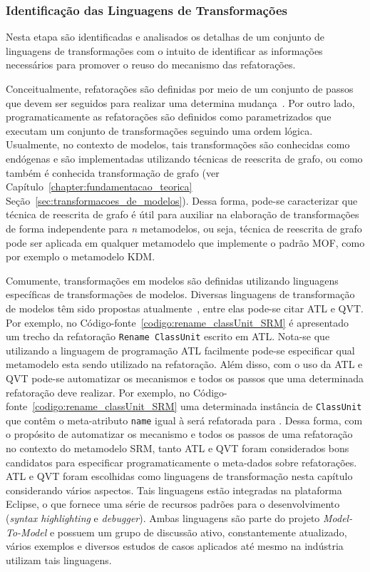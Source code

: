 \subsubsection{Identificação das Linguagens de Transformações}

Nesta etapa são identificadas e analisados os detalhas de um conjunto de linguagens de transformações com o intuito de identificar as informações necessários para promover o reuso do mecanismo das refatorações. 

Conceitualmente, refatorações são definidas por meio de um conjunto de passos que devem ser seguidos para realizar uma determina mudança~\cite{Fowler1999, Demeyer1}. Por outro lado, programaticamente as refatorações são definidos como  parametrizados que executam um conjunto de transformações seguindo uma ordem lógica. Usualmente, no contexto de modelos, tais transformações são conhecidas como endógenas e são implementadas utilizando técnicas de reescrita de grafo, ou como também é conhecida transformação de grafo (ver Capítulo~\ref{chapter:fundamentacao_teorica} Seção~\ref{sec:transformacoes_de_modelos}). Dessa forma, pode-se caracterizar que técnica de reescrita de grafo é útil para auxiliar na elaboração de transformações de forma independente para \textit{n} metamodelos, ou seja, técnica de reescrita de grafo pode ser aplicada em qualquer metamodelo que implemente o padrão MOF, como por exemplo o metamodelo KDM. 

Comumente, transformações em modelos são definidas utilizando linguagens específicas de transformações de modelos. Diversas linguagens de transformação de modelos têm sido propostas atualmente~\cite{Biehl_2010, Allilaire_06}, entre elas pode-se citar ATL e QVT. Por exemplo, no Código-fonte~\ref{codigo:rename_classUnit_SRM} é apresentado um trecho da refatoração \texttt{Rename ClassUnit} escrito em ATL. Nota-se que utilizando a linguagem de programação ATL facilmente pode-se especificar qual metamodelo esta sendo utilizado na refatoração. Além disso, com o uso da ATL e QVT pode-se automatizar os mecanismos e todos os passos que uma determinada refatoração deve realizar. Por exemplo, no Código-fonte~\ref{codigo:rename_classUnit_SRM} uma determinada instância de \texttt{ClassUnit} que contêm o meta-atributo \texttt{name} igual à  será refatorada para . Dessa forma, com o propósito de automatizar os mecanismo e todos os passos de uma refatoração no contexto do metamodelo SRM, tanto ATL e QVT foram considerados bons candidatos para especificar programaticamente o meta-dados sobre refatorações. ATL e QVT foram escolhidas como linguagens de transformação nesta capítulo considerando vários aspectos. Tais linguagens estão integradas na plataforma Eclipse, o que fornece uma série de recursos padrões para o desenvolvimento (\textit{syntax highlighting} e \textit{debugger}). Ambas linguagens são parte do projeto \textit{Model-To-Model} e possuem um grupo de discussão ativo, constantemente atualizado, vários exemplos e diversos estudos de casos aplicados até mesmo na indústria utilizam tais linguagens.


